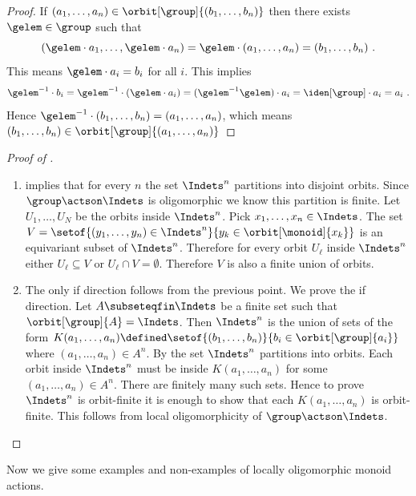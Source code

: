 %
\begin{proof}
If $(a_1,\dots,a_n)\in\orbit[\group]{(b_1,\dots,b_n)}$ then there exists $\gelem\in\group$ such that
\[
(\gelem\cdot a_1,\dots,\gelem\cdot a_n) =
\gelem\cdot(a_1,\dots,a_n) =
(b_1,\dots,b_n) \ .
\]
This means $\gelem\cdot a_i = b_i$ for all $i$.
This implies
\[
\gelem^{-1}\cdot b_i = \gelem^{-1}\cdot(\gelem\cdot a_i) =
(\gelem^{-1}\gelem)\cdot a_i = \iden[\group]\cdot a_i  = a_i\ .
\]
Hence $\gelem^{-1}\cdot(b_1,\dots,b_n) = (a_1,\dots,a_n)$,
which means $(b_1,\dots,b_n)\in\orbit[\group]{(a_1,\dots,a_n)}$
\end{proof}
%
\begin{proof}[Proof of ]
\begin{enumerate}
\item {} implies that for every $n$ the set $\Indets^n$ partitions into disjoint orbits.
Since $\group\actson\Indets$ is oligomorphic we know this partition is finite.
Let $U_1,\dots,U_N$ be the orbits inside $\Indets^n$.
Pick $x_1,\dots,x_n\in\Indets$.
The set $V = \setof{(y_1,\dots,y_n)\in\Indets^n}{y_k\in\orbit[\monoid]{x_k}}$ is an equivariant subset of $\Indets^n$.
Therefore for every orbit $U_{\ell}$ inside $\Indets^n$ either $U_{\ell} \subseteq V$ or $U_{\ell} \cap V = \emptyset$.
Therefore $V$ is also a finite union of orbits. 
\item The only if direction follows from the previous point.
We prove the if direction.
Let $A\subseteqfin\Indets$ be a finite set such that $\orbit[\group]{A} = \Indets$.
Then $\Indets^n$ is the union of sets of the form $K(a_1,\dots,a_n)\defined\setof{(b_1,\dots,b_n)}{b_i\in\orbit[\group]{a_i}}$ where $(a_1,\dots,a_n)\in A^n$.
By  the set $\Indets^n$ partitions into orbits.
Each orbit inside $\Indets^n$ must be inside $K(a_1,\dots,a_n)$ for some $(a_1,\dots,a_n)\in A^n$.
There are finitely many such sets.
Hence to prove $\Indets^n$ is orbit-finite it is enough to show that each $K(a_1,\dots,a_n)$ is orbit-finite.
This follows from local oligomorphicity of $\group\actson\Indets$.
\end{enumerate}
\end{proof}
%
Now we give some examples and non-examples of locally oligomorphic monoid actions.
%
